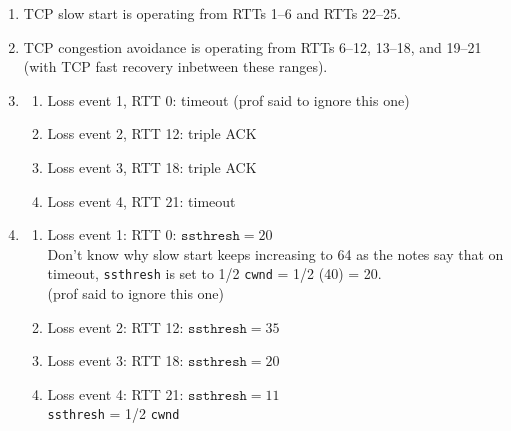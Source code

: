 \documentclass{report}
\begin{document}
\begin{problem}
\begin{answer}{25em}
  \begin{enumerate}
    \item TCP slow start is operating from RTTs 1--6 and RTTs 22--25.
    \item TCP congestion avoidance is operating from RTTs 6--12, 13--18, and
      19--21 (with TCP fast recovery inbetween these ranges).
    \item
      \begin{enumerate}
        \item Loss event 1, RTT 0: timeout (prof said to ignore this one)
        \item Loss event 2, RTT 12: triple ACK
        \item Loss event 3, RTT 18: triple ACK
        \item Loss event 4, RTT 21: timeout
      \end{enumerate}
    \item
      \begin{enumerate}
        \item Loss event 1: RTT 0: $ \texttt{ssthresh} = 20 $\\
              Don't know why slow start keeps increasing to 64 as the notes
              say that on timeout, \texttt{ssthresh} is set to 1/2
              \texttt{cwnd} = 1/2 (40) = 20.\\
              (prof said to ignore this one)
        \item Loss event 2: RTT 12: $ \texttt{ssthresh} = 35 $
        \item Loss event 3: RTT 18: $ \texttt{ssthresh} = 20 $
        \item Loss event 4: RTT 21: $ \texttt{ssthresh} = 11 $\\
              \texttt{ssthresh} = 1/2 \texttt{cwnd}
      \end{enumerate}
  \end{enumerate}
\end{answer}

\end{problem}
\end{document}
